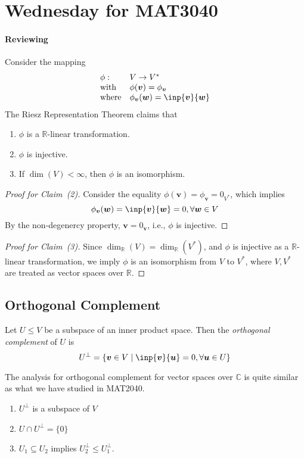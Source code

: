 
\section{Wednesday for MAT3040}

\paragraph{Reviewing}
Consider the mapping
\[
\begin{array}{ll}
\phi:&V\to V^*\\
\text{with}&\phi(\bm v) = \phi_{\bm v}\\
\text{where}&\phi_{\bm v}(\bm w) = \inp{\bm v}{\bm w}
\end{array}
\]
The Riesz Representation Theorem claims that 
\begin{enumerate}
\item
$\phi$ is a $\mathbb{R}$-linear transformation.
\item
$\phi$ is injective.
\item
If $\dim(V)<\infty$, then $\phi$ is an isomorphism.
\end{enumerate}
\begin{proof}[Proof for Claim~(2)]
Consider the equality $\phi(\bm v) = \phi_{\bm v}=0_{V^*}$, which implies
\[
\phi_{\bm v}(\bm w)=\inp{\bm v}{\bm w}=0,\forall\bm w\in V
\]
By the non-degenercy property, $\bm v=0_{\bm v}$, i.e., $\phi$ is injective.
\end{proof}
\begin{proof}[Proof for Claim~(3)]
Since $\dim_{\mathbb{R}}(V)=\dim_{\mathbb{R}}(V^*)$, 
and $\phi$ is injective as a $\mathbb{R}$-linear transformation, 
we imply $\phi$ is an isomorphism from $V$ to $V^*$, where $V,V^*$ are treated as vector spaces over $\mathbb{R}$.
\end{proof}

\subsection{Orthogonal Complement}
\begin{definition}
Let $U\le V$ be a subspace of an inner product space.
Then the \emph{orthogonal complement} of $U$ is
\[
U^\perp
=
\{\bm v\in V\mid \inp{\bm v}{\bm u}=0,\forall \bm u\in U\}
\]
\end{definition}

The analysis for orthogonal complement for vector spaces over $\mathbb{C}$ is quite similar as what we have studied in MAT2040.
\begin{proposition}
\begin{enumerate}
\item
$U^\perp$ is a subspace of $V$
\item
$U\cap U^\perp = \{0\}$
\item
$U_1\subseteq U_2$ implies $U_2^\perp\le U_1^\perp$.
\end{enumerate}
\end{proposition}


